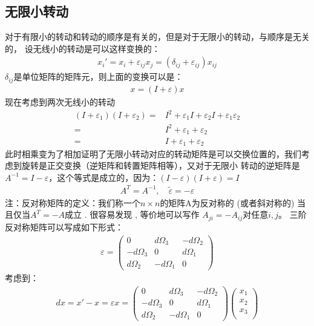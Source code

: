\documentclass[UTF8,10pt]{article}
\begin{document}
\subsection{无限小转动}
对于有限小的转动和转动的顺序是有关的，但是对于无限小的转动，与顺序是无关的，
设无线小的转动是可以这样变换的：
\begin{align*}
    x_{i}'=x_i+\varepsilon_{ij}x_j=(\delta_{ij}+\varepsilon_{ij})x_{ij}
\end{align*}
$\delta_{ij}$是单位矩阵的矩阵元，则上面的变换可以是：
\begin{align*}
    x=(I+\varepsilon)x
\end{align*}
现在考虑到两次无线小的转动
\begin{align*}
    (I+\varepsilon_1)(I+\varepsilon_2)= & I^2+\varepsilon_1 I+\varepsilon_2 I+\varepsilon_1\varepsilon_2 \\
    =                                   & I^2+\varepsilon_1+\varepsilon_2                                \\=&I+\varepsilon_1+\varepsilon_2
\end{align*}
此时相乘变为了相加证明了无限小转动对应的转动矩阵是可以交换位置的，我们考虑到旋转是正交变换（逆矩阵和转置矩阵相等），又对于无限小
转动的逆矩阵是$A^{-1}=I-\varepsilon$，这个等式是成立的，因为：$(I-\varepsilon)(I+\varepsilon)=I$
\begin{align*}
    A^T=A^{-1},\quad \tilde{\varepsilon}=-\varepsilon
\end{align*}
注：反对称矩阵的定义：我们称一个$n\times n$的矩阵A为反对称的 (或者斜对称的) 当且仅当$A^T=-A$成立 . 很容易发现 , 等价地可以写作 $A_{ji}=-A_{ij}$对任意$i,j$。
三阶反对称矩阵可以写成如下形式：
\begin{align*}
    \varepsilon=\left(\begin{array}{ccc}
                          0             & d \Omega_{3}  & -d \Omega_{2} \\
                          -d \Omega_{3} & 0             & d \Omega_{1}  \\
                          d \Omega_{2}  & -d \Omega_{1} & 0
                      \end{array}\right)
\end{align*}
考虑到：
\begin{align*}
    dx=x'-x=\varepsilon x
    =\left(\begin{array}{ccc}
               0             & d \Omega_{3}  & -d \Omega_{2} \\
               -d \Omega_{3} & 0             & d \Omega_{1}  \\
               d \Omega_{2}  & -d \Omega_{1} & 0
           \end{array}\right) \left( \begin{array}{c}
                                         x_1 \\
                                         x_2 \\
                                         x_3 \\
                                     \end{array} \right)
\end{align*}
\end{document}

